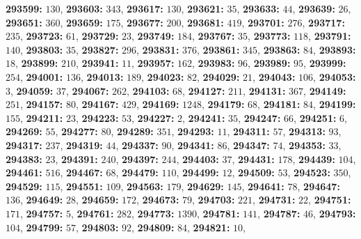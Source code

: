 \textsf{\bfseries 293599:} $130$, \textsf{\bfseries 293603:} $343$, \textsf{\bfseries 293617:} $130$, \textsf{\bfseries 293621:} $35$, \textsf{\bfseries 293633:} $44$, \textsf{\bfseries 293639:} $26$, \textsf{\bfseries 293651:} $360$, \textsf{\bfseries 293659:} $175$, \textsf{\bfseries 293677:} $200$, \textsf{\bfseries 293681:} $419$, \textsf{\bfseries 293701:} $276$, \textsf{\bfseries 293717:} $235$, \textsf{\bfseries 293723:} $61$, \textsf{\bfseries 293729:} $23$, \textsf{\bfseries 293749:} $184$, \textsf{\bfseries 293767:} $35$, \textsf{\bfseries 293773:} $118$, \textsf{\bfseries 293791:} $140$, \textsf{\bfseries 293803:} $35$, \textsf{\bfseries 293827:} $296$, \textsf{\bfseries 293831:} $376$, \textsf{\bfseries 293861:} $345$, \textsf{\bfseries 293863:} $84$, \textsf{\bfseries 293893:} $18$, \textsf{\bfseries 293899:} $210$, \textsf{\bfseries 293941:} $11$, \textsf{\bfseries 293957:} $162$, \textsf{\bfseries 293983:} $96$, \textsf{\bfseries 293989:} $95$, \textsf{\bfseries 293999:} $254$, \textsf{\bfseries 294001:} $136$, \textsf{\bfseries 294013:} $189$, \textsf{\bfseries 294023:} $82$, \textsf{\bfseries 294029:} $21$, \textsf{\bfseries 294043:} $106$, \textsf{\bfseries 294053:} $3$, \textsf{\bfseries 294059:} $37$, \textsf{\bfseries 294067:} $262$, \textsf{\bfseries 294103:} $68$, \textsf{\bfseries 294127:} $211$, \textsf{\bfseries 294131:} $367$, \textsf{\bfseries 294149:} $251$, \textsf{\bfseries 294157:} $80$, \textsf{\bfseries 294167:} $429$, \textsf{\bfseries 294169:} $1248$, \textsf{\bfseries 294179:} $68$, \textsf{\bfseries 294181:} $84$, \textsf{\bfseries 294199:} $155$, \textsf{\bfseries 294211:} $23$, \textsf{\bfseries 294223:} $53$, \textsf{\bfseries 294227:} $2$, \textsf{\bfseries 294241:} $35$, \textsf{\bfseries 294247:} $66$, \textsf{\bfseries 294251:} $6$, \textsf{\bfseries 294269:} $55$, \textsf{\bfseries 294277:} $80$, \textsf{\bfseries 294289:} $351$, \textsf{\bfseries 294293:} $11$, \textsf{\bfseries 294311:} $57$, \textsf{\bfseries 294313:} $93$, \textsf{\bfseries 294317:} $237$, \textsf{\bfseries 294319:} $44$, \textsf{\bfseries 294337:} $90$, \textsf{\bfseries 294341:} $86$, \textsf{\bfseries 294347:} $74$, \textsf{\bfseries 294353:} $33$, \textsf{\bfseries 294383:} $23$, \textsf{\bfseries 294391:} $240$, \textsf{\bfseries 294397:} $244$, \textsf{\bfseries 294403:} $37$, \textsf{\bfseries 294431:} $178$, \textsf{\bfseries 294439:} $104$, \textsf{\bfseries 294461:} $516$, \textsf{\bfseries 294467:} $68$, \textsf{\bfseries 294479:} $110$, \textsf{\bfseries 294499:} $12$, \textsf{\bfseries 294509:} $53$, \textsf{\bfseries 294523:} $350$, \textsf{\bfseries 294529:} $115$, \textsf{\bfseries 294551:} $109$, \textsf{\bfseries 294563:} $179$, \textsf{\bfseries 294629:} $145$, \textsf{\bfseries 294641:} $78$, \textsf{\bfseries 294647:} $136$, \textsf{\bfseries 294649:} $28$, \textsf{\bfseries 294659:} $172$, \textsf{\bfseries 294673:} $79$, \textsf{\bfseries 294703:} $221$, \textsf{\bfseries 294731:} $22$, \textsf{\bfseries 294751:} $171$, \textsf{\bfseries 294757:} $5$, \textsf{\bfseries 294761:} $282$, \textsf{\bfseries 294773:} $1390$, \textsf{\bfseries 294781:} $141$, \textsf{\bfseries 294787:} $46$, \textsf{\bfseries 294793:} $104$, \textsf{\bfseries 294799:} $57$, \textsf{\bfseries 294803:} $92$, \textsf{\bfseries 294809:} $84$, \textsf{\bfseries 294821:} $10$, 
